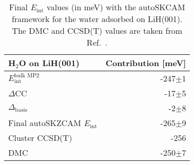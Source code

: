\begin{table}[h]
\caption{\label{tab:lih_eint}Final $E_\text{int}$ values (in meV) with the autoSKCAM framework for the water adsorbed on LiH(001). The DMC and CCSD(T) values are taken from Ref.~.}
\begin{adjustbox}{center,max width=1\textwidth}
\begin{tabular}{lr}
\toprule
 H$_2$O on LiH(001) & Contribution [meV] \\ 
\midrule
$E_\text{int}^\text{bulk MP2}$ & -247$\pm$1 \\
$\Delta$CC & -17$\pm$5 \\
$\Delta_\text{basis}$ & -2$\pm$8 \\
Final autoSKZCAM $E_\text{int}$ & -265$\pm$9 \\
Cluster CCSD(T)~\cite{tsatsoulisComparisonQuantumChemistry2017} & -256 \\
DMC~\cite{tsatsoulisComparisonQuantumChemistry2017} & -250$\pm$7 \\
\bottomrule
\end{tabular}
\end{adjustbox}
\end{table}